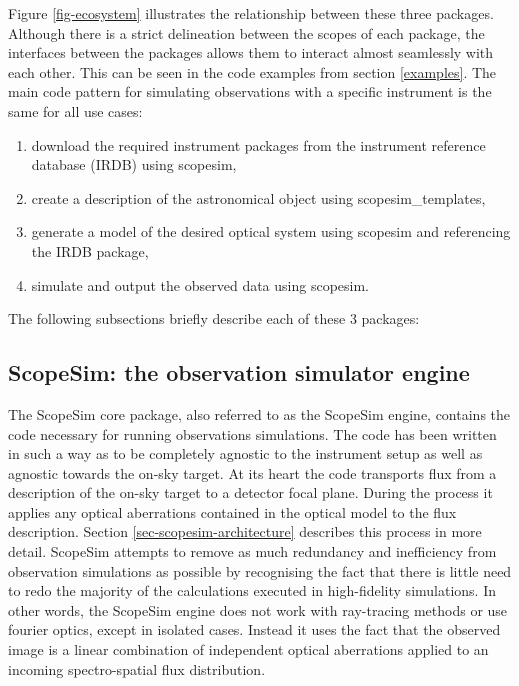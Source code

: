 Figure \ref{fig-ecosystem} illustrates the relationship between these three packages.
Although there is a strict delineation between the scopes of each package, the interfaces between the packages allows them to interact almost seamlessly with each other.
This can be seen in the code examples from section \ref{examples}.
The main code pattern for simulating observations with a specific instrument is the same for all use cases:

\begin{enumerate}
\item download the required instrument packages from the instrument reference database (IRDB) using scopesim,

\item create a description of the astronomical object using scopesim\_templates,

\item generate a model of the desired optical system using scopesim and referencing the IRDB package,

\item simulate and output the observed data using scopesim.
\end{enumerate}

The following subsections briefly describe each of these 3 packages:


\subsection{ScopeSim: the observation simulator engine%
  \label{scopesim-the-observation-simulator-engine}%
}

The ScopeSim core package, also referred to as the ScopeSim engine, contains the code necessary for running observations simulations.
The code has been written in such a way as to be completely agnostic to the instrument setup as well as agnostic towards the on-sky target.
At its heart the code transports flux from a description of the on-sky target to a detector focal plane.
During the process it applies any optical aberrations contained in the optical model to the flux description.
Section \ref{sec-scopesim-architecture} describes this process in more detail.
ScopeSim attempts to remove as much redundancy and inefficiency from observation simulations as possible by recognising the fact that there is little need to redo the majority of the calculations executed in high-fidelity simulations.
In other words, the ScopeSim engine does not work with ray-tracing methods or use fourier optics, except in isolated cases.
Instead it uses the fact that the observed image is a linear combination of independent optical aberrations applied to an incoming spectro-spatial flux distribution.

